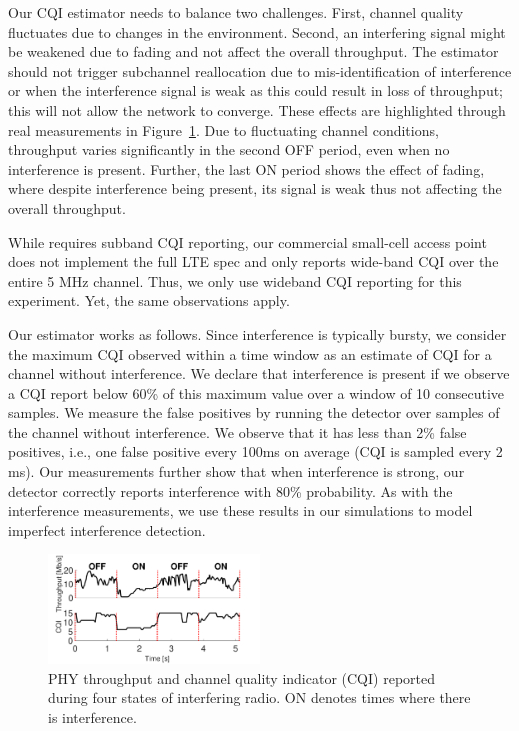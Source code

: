Our CQI estimator needs to balance two challenges. First, channel quality fluctuates due to changes in the environment.
Second, an interfering signal might be weakened due to fading and not affect the overall throughput. 
The estimator should not trigger subchannel reallocation due to mis-identification of interference or when 
the interference signal is weak as this could result in loss of throughput; this will not allow the network to converge. 
These effects are highlighted through real measurements in Figure~\ref{fig:interf_control_time}. 
Due to fluctuating channel conditions, throughput varies significantly in the second OFF period, even when no interference is present.
Further, the last ON period shows the effect of fading, where despite interference being present, its signal is weak thus not affecting the overall throughput.

While \cf requires subband CQI reporting, our commercial small-cell access point does not implement the full LTE spec 
and only reports wide-band CQI over the entire 5 MHz channel. Thus, we only use wideband CQI reporting for this experiment. 
Yet, the same observations apply.

Our estimator works as follows. Since interference is typically bursty, we consider the maximum CQI observed within a time window as an estimate of CQI for a channel without interference. 
We declare that interference is present if we observe a CQI report below 60\% of this maximum value over a window of 10 consecutive samples. 
We measure the false positives by running the detector over samples of the channel without interference. 
We observe that it has less than 2\% false positives, i.e., one false positive every 100ms on average
(CQI is sampled every 2 ms). 
Our measurements further show that when interference is strong, our detector correctly reports interference with 80\% probability.
As with the interference measurements, we use these results in our simulations to model imperfect interference detection. 


\begin{figure}[t]
  \centering
    \includegraphics[width=0.5\textwidth]{./figs/cqi_time.pdf}
    \vspace{-0.3in}
  \caption{PHY throughput and channel quality indicator (CQI) reported during four states of interfering radio. 
ON denotes times where there is interference. }
  \label{fig:interf_control_time}
\vskip -6pt
\end{figure}

